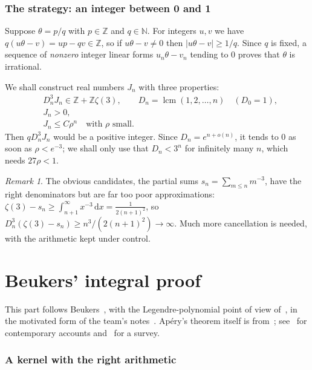 \documentclass[11pt]{article}
\newcommand{\Z}{\mathbb{Z}}
\newcommand{\N}{\mathbb{N}}
\newcommand{\dd}{\,\mathrm{d}}
\newcommand{\Dn}{D_n}
\DeclareMathOperator{\lcm}{lcm}
\theoremstyle{plain}
\theoremstyle{definition}
\theoremstyle{remark}
\newtheorem{remark}[theorem]{Remark}
\begin{document}
\section{The strategy: an integer between 0 and 1}\label{sec:strategy}

Suppose $\theta=p/q$ with $p\in\Z$ and $q\in\N$. For integers $u,v$ we have
$q(u\theta-v)=up-qv\in\Z$, so if $u\theta-v\ne0$ then $|u\theta-v|\ge1/q$. Since $q$ is fixed, a
sequence of \emph{nonzero} integer linear forms $u_n\theta-v_n$ tending to $0$ proves that $\theta$
is irrational.

We shall construct real numbers $J_n$ with three properties:
\begin{align}
  &\Dn^3J_n\in\Z+\Z\zeta(3), \qquad \Dn=\lcm(1,2,\dots,n)\quad(D_0=1), \label{eq:arith}\\
  &J_n>0, \label{eq:pos}\\
  &J_n\le C\rho^n \quad\text{with } \rho \text{ small.} \label{eq:small}
\end{align}
Then $q\Dn^3J_n$ would be a positive integer. Since $\Dn=e^{n+o(n)}$, it tends to $0$ as soon as
$\rho<e^{-3}$; we shall only use that $\Dn<3^n$ for infinitely many $n$, which needs $27\rho<1$.

\begin{remark}
The obvious candidates, the partial sums $s_n=\sum_{m\le n}m^{-3}$, have the right denominators
but are far too poor approximations: $\zeta(3)-s_n\ge\int_{n+1}^\infty x^{-3}\dd x=\frac1{2(n+1)^2}$,
so $\Dn^3(\zeta(3)-s_n)\ge n^3/(2(n+1)^2)\to\infty$. Much more cancellation is needed, with the
arithmetic kept under control.
\end{remark}

\part{Beukers' integral proof}\label{part:beukers}

This part follows Beukers~\cite{beukers79}, with the Legendre-polynomial point of view of~\cite{beukers80},
in the motivated form of the team's notes~\cite{codexnotes}. Ap\'ery's theorem itself is from~\cite{apery};
see~\cite{vdp,cohen} for contemporary accounts and~\cite{fischler} for a survey.

\section{A kernel with the right arithmetic}\label{sec:kernel}
\end{document}
